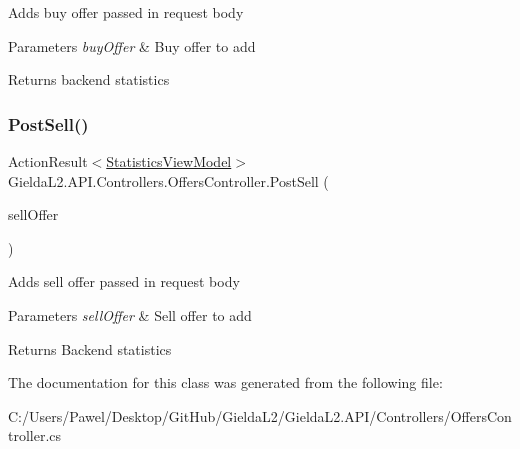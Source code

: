 Adds buy offer passed in request body 


\begin{DoxyParams}{Parameters}
{\em buy\+Offer} & Buy offer to add\\
\hline
\end{DoxyParams}
\begin{DoxyReturn}{Returns}
backend statistics
\end{DoxyReturn}
\mbox{\label{class_gielda_l2_1_1_a_p_i_1_1_controllers_1_1_offers_controller_a30bc8e1a4fcc81aa32fff84c054bfb3f}} 
\subsubsection{\texorpdfstring{PostSell()}{PostSell()}}
{\footnotesize\ttfamily Action\+Result$<$\mbox{\hyperlink{class_gielda_l2_1_1_a_p_i_1_1_view_models_1_1_view_1_1_statistics_view_model}{Statistics\+View\+Model}}$>$ Gielda\+L2.\+A\+P\+I.\+Controllers.\+Offers\+Controller.\+Post\+Sell (\begin{DoxyParamCaption}\item[{\mbox{[}\+From\+Body\mbox{]} \mbox{\hyperlink{class_gielda_l2_1_1_a_p_i_1_1_view_models_1_1_edit_1_1_edit_sell_offer_view_model}{Edit\+Sell\+Offer\+View\+Model}}}]{sell\+Offer }\end{DoxyParamCaption})}



Adds sell offer passed in request body 


\begin{DoxyParams}{Parameters}
{\em sell\+Offer} & Sell offer to add\\
\hline
\end{DoxyParams}
\begin{DoxyReturn}{Returns}
Backend statistics
\end{DoxyReturn}


The documentation for this class was generated from the following file\+:\begin{DoxyCompactItemize}
\item 
C\+:/\+Users/\+Pawel/\+Desktop/\+Git\+Hub/\+Gielda\+L2/\+Gielda\+L2.\+A\+P\+I/\+Controllers/Offers\+Controller.\+cs\end{DoxyCompactItemize}
